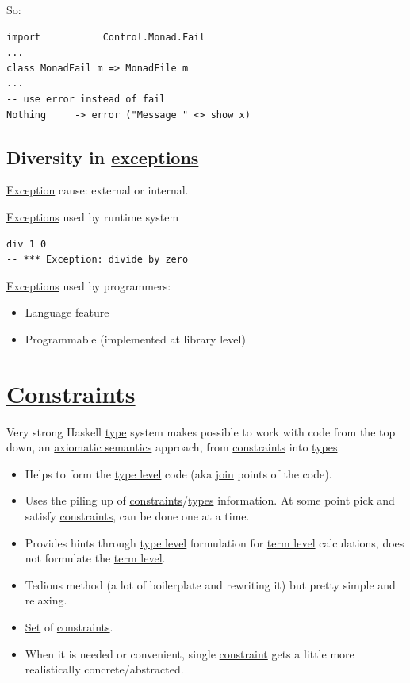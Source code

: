 \documentclass[a4paper,14pt,oneside]{book}
\begin{document}
So:
\begin{verbatim}
import           Control.Monad.Fail
...
class MonadFail m => MonadFile m
...
-- use error instead of fail
Nothing     -> error ("Message " <> show x)
\end{verbatim}

\section{Diversity in \hyperref[org91c0ee8]{exceptions}}
\label{sec:orgba9745a}

\hyperref[orgc6c2b0b]{Exception} cause: external or internal.

\hyperref[org91c0ee8]{Exceptions} used by runtime system

\begin{verbatim}
div 1 0
-- *** Exception: divide by zero
\end{verbatim}

\hyperref[org91c0ee8]{Exceptions} used by programmers:
\begin{itemize}
\item Language feature
\item Programmable (implemented at library level)
\end{itemize}

\chapter{\hyperref[org0febfcf]{Constraints}}
\label{sec:org731fe6a}

Very strong Haskell \hyperref[org7c4e373]{type} system makes possible to work with code from the top down, an \hyperref[orgdf22f69]{axiomatic semantics} approach, from \hyperref[org0febfcf]{constraints} into \hyperref[org5a18391]{types}.

\begin{itemize}
\item Helps to form the \hyperref[org3f99683]{type level} code (aka \hyperref[org5dfa07b]{join} points of the code).
\item Uses the piling up of \hyperref[org0febfcf]{constraints}/\hyperref[org5a18391]{types} information. At some point pick and satisfy \hyperref[org0febfcf]{constraints}, can be done one at a time.
\item Provides hints through \hyperref[org3f99683]{type level} formulation for \hyperref[org3980d0e]{term level} calculations, does not formulate the \hyperref[org3980d0e]{term level}.
\item Tedious method (a lot of boilerplate and rewriting it) but pretty simple and relaxing.

\item \hyperref[org99b1186]{Set} of \hyperref[org0febfcf]{constraints}.

\item When it is needed or convenient, single \hyperref[org7c03d46]{constraint} gets a little more realistically concrete/abstracted.
\end{itemize}
\end{document}
